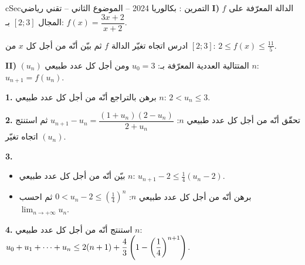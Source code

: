 \documentclass[12pt,a4paper]{article}
\newenvironment{BOX}[2]{\begin{otherlanguage}{english}\begin{arbox}{#1}{#2}}{\end{arbox}\end{otherlanguage}}
\newcounter{exo}
\newenvironment{tamrin}[1]{\stepcounter{exo}\begin{BOX}{cSec}{التمرين \theexo: #1}}{\end{BOX}}
\renewcommand{\cdots}{\mathinner{\cdotp\cdotp\cdotp}}
\newcommand{\limn}{\displaystyle\lim_{n\to+\infty}}
\newenvironment{sq}{\begin{itemize}[leftmargin=2.4em,itemsep=3pt]}{\end{itemize}}
\newcommand{\qa}{\item[(أ)]}\newcommand{\qb}{\item[(ب)]}\newcommand{\qc}{\item[(جـ)]}\newcommand{\qd}{\item[(د)]}\newcommand{\qe}{\item[(هـ)]}
\begin{document}
\begin{tamrin}{بكالوريا 2024 -- الموضوع الثاني -- تقني رياضي}
\textbf{I)} $f$ الدالة المعرّفة على المجال $[2;3]$ بـ: $f(x)=\dfrac{3x+2}{x+2}$.

ادرس اتجاه تغيّر الدالة $f$ ثم بيّن أنّه من أجل كل $x$ من $[2;3]$: $2\le f(x)\le\frac{11}{5}$.

\textbf{II)} $(u_n)$ المتتالية العددية المعرّفة بـ: $u_0=3$ ومن أجل كل عدد طبيعي $n$: $u_{n+1}=f(u_n)$.

\textbf{1.} برهن بالتراجع أنّه من أجل كل عدد طبيعي $n$: $2<u_n\le3$.

\textbf{2.} تحقّق أنّه من أجل كل عدد طبيعي $n$: $u_{n+1}-u_n=\dfrac{(1+u_n)(2-u_n)}{2+u_n}$ ثم استنتج اتجاه تغيّر $(u_n)$.

\textbf{3.}
\begin{sq}
\qa بيّن أنّه من أجل كل عدد طبيعي $n$: $u_{n+1}-2\le\frac14\left(u_n-2\right)$.
\qb برهن أنّه من أجل كل عدد طبيعي $n$: $0<u_n-2\le\left(\frac14\right)^n$ ثم احسب $\limn u_n$.
\end{sq}
\textbf{4.} استنتج أنّه من أجل كل عدد طبيعي $n$: $u_0+u_1+\cdots+u_n\le2(n+1)+\dfrac43\left(1-\left(\dfrac14\right)^{n+1}\right)$.
\end{tamrin}
\end{document}
